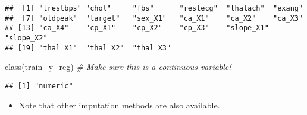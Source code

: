 \documentclass[
]{book}
\newenvironment{Shaded}{\begin{snugshade}}{\end{snugshade}}
\newcommand{\AttributeTok}[1]{\textcolor[rgb]{0.77,0.63,0.00}{#1}}
\newcommand{\CommentTok}[1]{\textcolor[rgb]{0.56,0.35,0.01}{\textit{#1}}}
\newcommand{\FunctionTok}[1]{\textcolor[rgb]{0.00,0.00,0.00}{#1}}
\newcommand{\NormalTok}[1]{#1}
\newcommand{\OtherTok}[1]{\textcolor[rgb]{0.56,0.35,0.01}{#1}}
\newcommand{\SpecialCharTok}[1]{\textcolor[rgb]{0.00,0.00,0.00}{#1}}
\providecommand{\tightlist}{%
  \setlength{\itemsep}{0pt}\setlength{\parskip}{0pt}}
\begin{document}
\begin{Shaded}
\end{Shaded}

\begin{verbatim}
##  [1] "trestbps" "chol"     "fbs"      "restecg"  "thalach"  "exang"   
##  [7] "oldpeak"  "target"   "sex_X1"   "ca_X1"    "ca_X2"    "ca_X3"   
## [13] "ca_X4"    "cp_X1"    "cp_X2"    "cp_X3"    "slope_X1" "slope_X2"
## [19] "thal_X1"  "thal_X2"  "thal_X3"
\end{verbatim}

\begin{Shaded}
\begin{Highlighting}[]
\FunctionTok{class}\NormalTok{(train\_y\_reg) }\CommentTok{\# Make sure this is a continuous variable!}
\end{Highlighting}
\end{Shaded}

\begin{verbatim}
## [1] "numeric"
\end{verbatim}

\begin{itemize}
\tightlist
\item
  Note that other imputation methods are also available.
\end{itemize}
\end{document}
